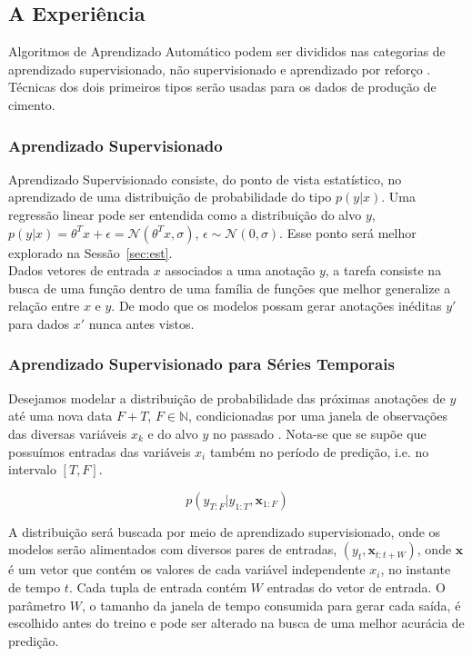 \subsection{A Experiência}
\label{sec:exp}
Algoritmos de Aprendizado Automático podem ser divididos nas categorias de
aprendizado supervisionado, não supervisionado e aprendizado por reforço
\citep{dlbook}. Técnicas dos dois primeiros tipos serão usadas para os dados de
produção de cimento.


\subsubsection{Aprendizado Supervisionado}
\label{sec:apren} 
Aprendizado Supervisionado consiste, do ponto de vista estatístico, no
aprendizado de uma distribuição de probabilidade do tipo $p(y | x)$. Uma
regressão linear pode ser entendida como a distribuição do alvo $y$, $p(y | x) = \theta^Tx + \epsilon =
\mathcal{N}(\theta^Tx,\sigma) $, $\epsilon \sim \mathcal{N}(0,\sigma)$. Esse ponto será melhor
explorado na Sessão~\ref{sec:est}. \\ 

Dados vetores de entrada $x$ associados a uma anotação $y$, a tarefa consiste na busca de uma
função dentro de uma família de funções que melhor generalize a relação entre
$x$ e $y$. De modo que os modelos possam gerar anotações inéditas $y'$ para
dados $x'$ nunca antes vistos. 


\subsubsection{Aprendizado Supervisionado para Séries Temporais}

Desejamos modelar a distribuição de probabilidade das próximas anotações
de $y$ até uma nova data $F + T$, $F \in \mathbb{N}$, condicionadas por uma janela de
observações das diversas variáveis  $x_k$ e do alvo $y$ no passado
\citep{deepfactors}. Nota-se que se supõe que possuímos entradas das
variáveis $x_i$ também no período de predição, i.e. no intervalo $[T,F]$.

\[ p(y_{T:F} | y_{1:T},\textbf{x}_{{1}:F}) \]

A distribuição será buscada por meio de aprendizado supervisionado, onde os
modelos serão alimentados com diversos pares de entradas,
$(y_t,\textbf{x}_{t:t+W})$, onde $\textbf{x}$ é um vetor que contém os valores de
cada variável independente $x_i$, no instante de tempo $t$. Cada tupla de
entrada contém $W$ entradas do vetor de entrada. O parâmetro $W$, o
tamanho da janela de tempo consumida para gerar cada saída, é escolhido antes do
treino e pode ser alterado na busca de uma melhor acurácia de predição.


